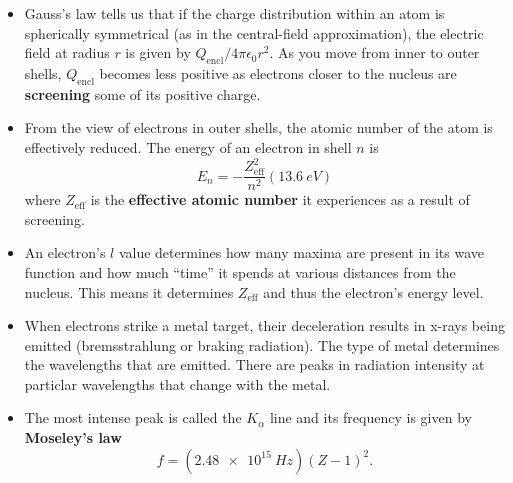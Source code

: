 \documentclass{article}
\begin{document}
\begin{itemize}
  \item Gauss's law tells us that if the charge distribution within an atom is spherically symmetrical (as in the central-field approximation), the electric field at radius $r$ is given by $Q_\text{encl} / 4 \pi \epsilon_0 r^2$. As you move from inner to outer shells, $Q_\text{encl}$ becomes less positive as electrons closer to the nucleus are \textbf{screening} some of its positive charge.

  \item From the view of electrons in outer shells, the atomic number of the atom is effectively reduced. The energy of an electron in shell $n$ is \[E_n = -\frac{Z_\text{eff}^2}{n^2} (\qty{13.6}{eV})\] where $Z_\text{eff}$ is the \textbf{effective atomic number} it experiences as a result of screening.

  \item An electron's $l$ value determines how many maxima are present in its wave function and how much ``time'' it spends at various distances from the nucleus. This means it determines $Z_\text{eff}$ and thus the electron's energy level.

  \item When electrons strike a metal target, their deceleration results in x-rays being emitted (bremsstrahlung or braking radiation). The type of metal determines the wavelengths that are emitted. There are peaks in radiation intensity at particlar wavelengths that change with the metal.

  \item The most intense peak is called the $K_\alpha$ line and its frequency is given by \textbf{Moseley's law} \[f = (\qty{2.48e15}{Hz}) (Z - 1)^2.\]
\end{itemize}
\end{document}

